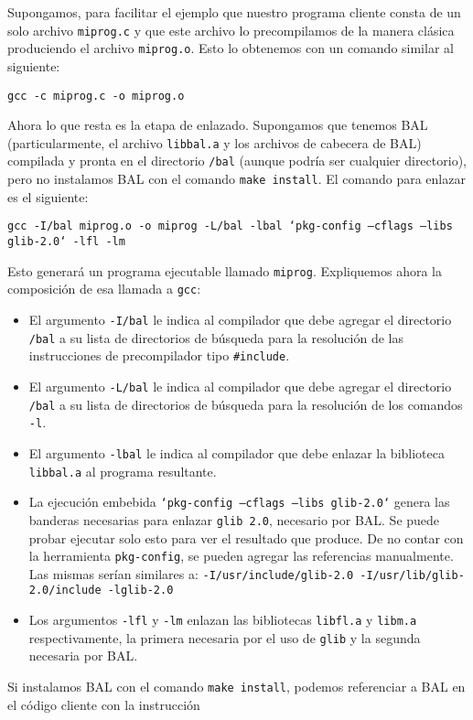 Supongamos, para facilitar el ejemplo que nuestro programa cliente consta de un solo archivo {\tt miprog.c} y que este archivo lo precompilamos de la manera clásica produciendo el archivo {\tt miprog.o}. Esto lo obtenemos con un comando similar al siguiente:

{\tt  gcc -c miprog.c -o miprog.o }

Ahora lo que resta es la etapa de enlazado. Supongamos que tenemos BAL (particularmente, el archivo {\tt libbal.a} y los archivos de cabecera de BAL) compilada y pronta en el directorio {\tt /bal} (aunque podría ser cualquier directorio), pero no instalamos BAL con el comando {\tt make install}. El comando para enlazar es el siguiente:

{\tt  gcc -I/bal miprog.o -o miprog -L/bal -lbal `pkg-config --cflags --libs glib-2.0` -lfl -lm }

Esto generará un programa ejecutable llamado {\tt miprog}. Expliquemos ahora la composición de esa llamada a {\tt gcc}: \begin{itemize}
\item El argumento {\tt -I/bal} le indica al compilador que debe agregar el directorio {\tt /bal} a su lista de directorios de búsqueda para la resolución de las instrucciones de precompilador tipo {\tt \#include}. \item El argumento {\tt -L/bal} le indica al compilador que debe agregar el directorio {\tt /bal} a su lista de directorios de búsqueda para la resolución de los comandos {\tt -l}. \item El argumento {\tt -lbal} le indica al compilador que debe enlazar la biblioteca {\tt libbal.a} al programa resultante. \item La ejecución embebida {\tt `pkg-config --cflags --libs glib-2.0`} genera las banderas necesarias para enlazar {\tt glib 2.0}, necesario por BAL. Se puede probar ejecutar solo esto para ver el resultado que produce. De no contar con la herramienta {\tt pkg-config}, se pueden agregar las referencias manualmente. Las mismas serían similares a: {\tt -I/usr/include/glib-2.0 -I/usr/lib/glib-2.0/include -lglib-2.0} \item Los argumentos {\tt -lfl} y {\tt -lm} enlazan las bibliotecas {\tt libfl.a} y {\tt libm.a} respectivamente, la primera necesaria por el uso de {\tt glib} y la segunda necesaria por BAL. \end{itemize}


Si instalamos BAL con el comando {\tt make install}, podemos referenciar a BAL en el código cliente con la instrucción

